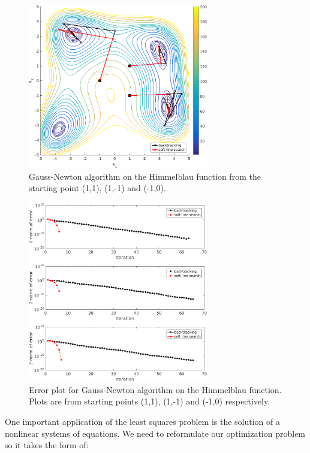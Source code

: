 \begin{figure}[htb]
\centering
\includegraphics[width=0.7\textwidth]{../img/gaussNewton}
\caption{Gauss-Newton algorithm on the Himmelblau function from the starting point (1,1), (1,-1) and (-1,0).}
\label{fig:gaussNewton}
\end{figure}

\begin{figure}[htb]
\centering
\includegraphics[width=0.7\textwidth]{../img/gaussNewtonError}
\caption{Error plot for Gauss-Newton algorithm on the Himmelblau function. Plots are from starting points (1,1), (1,-1) and (-1,0) respectively.}
\label{fig:rateConvGaussNewton}
\end{figure}

One important application of the least squares problem is the solution of a nonlinear systems of equations. We need to reformulate our optimization problem so it takes the form of: 

